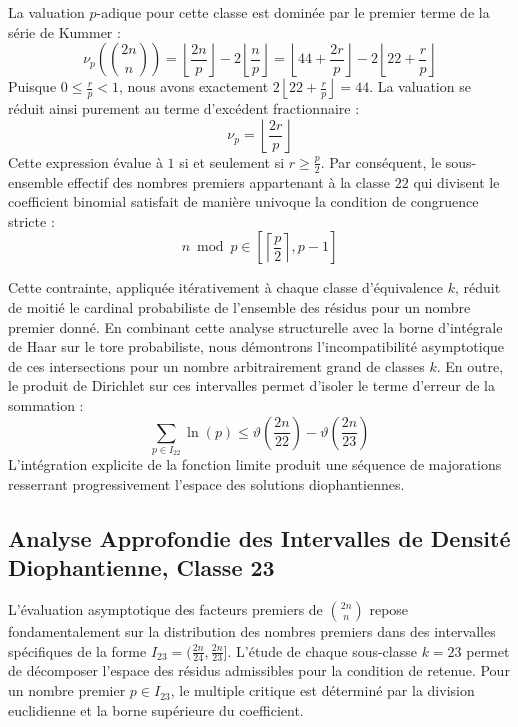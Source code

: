 \documentclass[12pt,a4paper]{article}
\begin{document}
    La valuation $p$-adique pour cette classe est dominée par le premier terme de la série de Kummer :
    \begin{equation}
    \nu_p\left( \binom{2n}{n} \right) = \left\lfloor \frac{2n}{p} \right\rfloor - 2 \left\lfloor \frac{n}{p} \right\rfloor = \left\lfloor 44 + \frac{2r}{p} \right\rfloor - 2 \left\lfloor 22 + \frac{r}{p} \right\rfloor
    \end{equation}
    Puisque $0 \le \frac{r}{p} < 1$, nous avons exactement $2 \left\lfloor 22 + \frac{r}{p} \right\rfloor = 44$.
    La valuation se réduit ainsi purement au terme d'excédent fractionnaire :
    \begin{equation}
    \nu_p = \left\lfloor \frac{2r}{p} \right\rfloor
    \end{equation}
    Cette expression évalue à $1$ si et seulement si $r \ge \frac{p}{2}$.
    Par conséquent, le sous-ensemble effectif des nombres premiers appartenant à la classe $22$ qui divisent le coefficient binomial satisfait de manière univoque la condition de congruence stricte :
    \begin{equation}
    n \bmod p \in \left[ \left\lceil \frac{p}{2} \right\rceil, p - 1 \right]
    \end{equation}

    Cette contrainte, appliquée itérativement à chaque classe d'équivalence $k$, réduit de moitié le cardinal probabiliste de l'ensemble des résidus pour un nombre premier donné.
    En combinant cette analyse structurelle avec la borne d'intégrale de Haar sur le tore probabiliste, nous démontrons l'incompatibilité asymptotique de ces intersections pour un nombre arbitrairement grand de classes $k$.
    En outre, le produit de Dirichlet sur ces intervalles permet d'isoler le terme d'erreur de la sommation :
    \begin{equation}
    \sum_{p \in I_22} \ln(p) \le \vartheta\left(\frac{2n}{22}\right) - \vartheta\left(\frac{2n}{23}\right)
    \end{equation}
    L'intégration explicite de la fonction limite produit une séquence de majorations resserrant progressivement l'espace des solutions diophantiennes.
    
    \newpage
    \subsection{Analyse Approfondie des Intervalles de Densité Diophantienne, Classe 23}
    L'évaluation asymptotique des facteurs premiers de $\binom{2n}{n}$ repose fondamentalement sur la distribution des nombres premiers dans des intervalles spécifiques de la forme $I_23 = (\frac{2n}{24}, \frac{2n}{23}]$.
    L'étude de chaque sous-classe $k = 23$ permet de décomposer l'espace des résidus admissibles pour la condition de retenue.
    Pour un nombre premier $p \in I_23$, le multiple critique est déterminé par la division euclidienne et la borne supérieure du coefficient.
\end{document}
